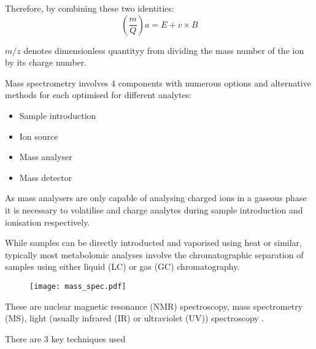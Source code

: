 Therefore, by combining these two identities:
\[(\frac{m}{Q}) a = E + v \times B\]


\(m/z\) denotes dimensionless quantityy from dividing the mass number of the ion by its charge number.




Mass spectrometry involves 4 components with numerous options and alternative methods for each
optimised for different analytes:
\begin{itemize}
    \item Sample introduction
    \item Ion source
    \item Mass analyser
    \item Mass detector 
\end{itemize}

As mass analysers are only capable of analysing charged ions in a gaseous phase it is necessary to volatilise 
and charge analytes during sample introduction and ionisation respectively. 

While samples can be directly introducted and vaporised using heat or similar, typically most metabolomic
analyses involve the chromatographic separation of samples using either liquid (LC) or gas (GC) chromatography.















\begin{figure}
    \texttt{[image: mass\_spec.pdf]}
    \label{Visualisation of Mass Spectrometry data when coupled with chromatographic techniques.
        The X axis represents the \(m/z\) ratio of an ion, the Y axis the retention time within the chromatographic
    separation method (GC, HPLC etc.) and Z the intensity detected at a given m/z}
    \label{fig:mass_spec}
\end{figure}






These are nuclear magnetic resonance (NMR) spectroscopy, mass spectrometry (MS), 
light (usually infrared (IR) or ultraviolet (UV)) spectroscopy \citep{Kafsack2010}.







There are 3 key techniques used




